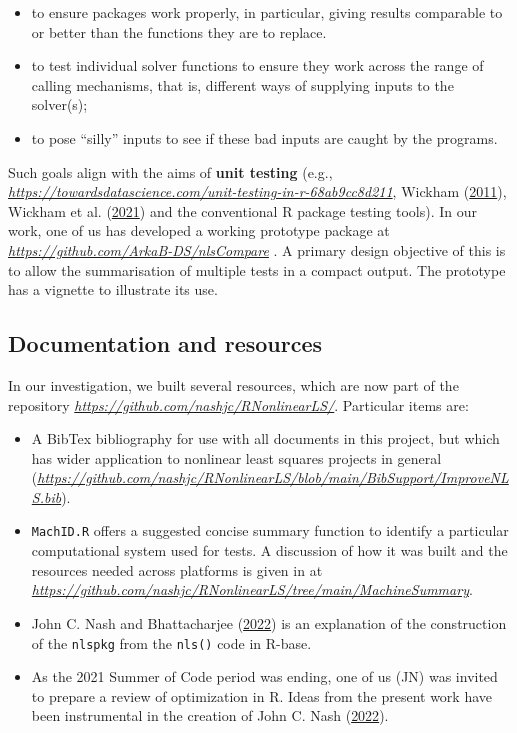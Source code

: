 \documentclass[
]{article}
\providecommand{\tightlist}{%
  \setlength{\itemsep}{0pt}\setlength{\parskip}{0pt}}
\begin{document}
\begin{itemize}
\tightlist
\item
  to ensure packages work properly, in particular, giving results
  comparable to or better than the functions they are to replace.
\item
  to test individual solver functions to ensure they work across the
  range of calling mechanisms, that is, different ways of supplying
  inputs to the solver(s);
\item
  to pose ``silly'' inputs to see if these bad inputs are caught by the
  programs.
\end{itemize}

Such goals align with the aims of \textbf{unit testing} (e.g.,
\emph{\url{https://towardsdatascience.com/unit-testing-in-r-68ab9cc8d211}},
Wickham (\protect\hyperlink{ref-HWtestthat11}{2011}), Wickham et al.
(\protect\hyperlink{ref-HWdevtools21}{2021}) and the conventional R
package testing tools). In our work, one of us has developed a working
prototype package at \emph{\url{https://github.com/ArkaB-DS/nlsCompare}}
. A primary design objective of this is to allow the summarisation of
multiple tests in a compact output. The prototype has a vignette to
illustrate its use.

\hypertarget{documentation-and-resources}{%
\subsection{Documentation and
resources}\label{documentation-and-resources}}

In our investigation, we built several resources, which are now part of
the repository \emph{\url{https://github.com/nashjc/RNonlinearLS/}}.
Particular items are:

\begin{itemize}
\item
  A BibTex bibliography for use with all documents in this project, but
  which has wider application to nonlinear least squares projects in
  general
  (\emph{\url{https://github.com/nashjc/RNonlinearLS/blob/main/BibSupport/ImproveNLS.bib}}).
\item
  \texttt{MachID.R} offers a suggested concise summary function to
  identify a particular computational system used for tests. A
  discussion of how it was built and the resources needed across
  platforms is given in at
  \emph{\url{https://github.com/nashjc/RNonlinearLS/tree/main/MachineSummary}}.
\item
  John C. Nash and Bhattacharjee
  (\protect\hyperlink{ref-PkgFromRbase22}{2022}) is an explanation of
  the construction of the \texttt{nlspkg} from the \texttt{nls()} code
  in R-base.
\item
  As the 2021 Summer of Code period was ending, one of us (JN) was
  invited to prepare a review of optimization in R. Ideas from the
  present work have been instrumental in the creation of John C. Nash
  (\protect\hyperlink{ref-NashWires22}{2022}).
\end{itemize}
\end{document}
